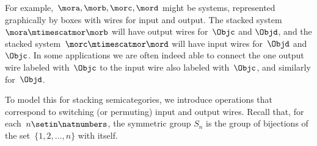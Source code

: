 For example,~$\mora, \morb, \morc, \mord$ might be systems, represented graphically by boxes with wires for input and output.
The stacked system~$\mora \mtimescatmor \morb$ will have output wires for~$\Objc$ and $\Objd$, and the stacked system~$\morc \mtimescatmor \mord$ will have input wires for~$\Objd$ and~$\Objc$.
In some applications we are often indeed able to connect the one output wire labeled with~$\Objc$ to the input wire also labeled with~$\Objc$, and similarly for~$\Objd$.

To model this for stacking semicategories, we introduce operations that correspond to switching (or permuting) input and output wires.
Recall that, for each~$n \setin \natnumbers$, the symmetric group $S_n$ is the group of bijections of the set~$\{1, 2, \ldots, n \}$ with itself.


